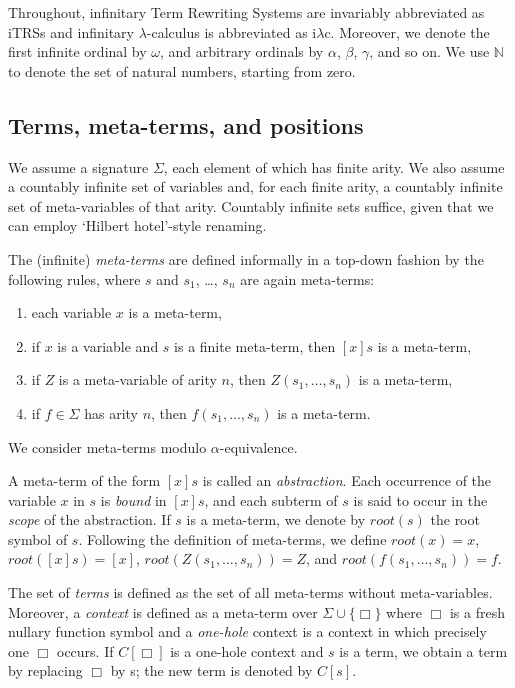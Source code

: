 \documentclass{LMCS}
\theoremstyle{definition}
\newcommand{\rs}[1]{root(#1)}
\newcommand{\natnum}{\mathbb{N}}
\newcommand{\iLC}{i$\lambda$c\xspace}
\begin{document}
Throughout, infinitary Term Rewriting Systems are invariably abbreviated as iTRSs and infinitary $\lambda$-calculus is abbreviated as \iLC. Moreover, we denote the first infinite ordinal by $\omega$, and arbitrary ordinals by $\alpha$, $\beta$, $\gamma$, and so on. We use $\natnum$ to denote the set of natural numbers, starting from zero.

\subsection{Terms, meta-terms, and positions}

We assume a signature $\Sigma$, each element of which has finite arity. We also assume a countably infinite set of variables and, for each finite arity, a countably infinite set of meta-variables of that arity. Countably infinite sets suffice, given that we can employ `Hilbert hotel'-style renaming. 

The (infinite) \emph{meta-terms} are defined informally in a top-down fashion by the following rules, where $s$ and $s_1$, \ldots, $s_n$ are again meta-terms:
\begin{enumerate}[(1)]
\item
each variable $x$ is a meta-term,
\item
if $x$ is a variable and $s$ is a finite meta-term, then $[x] s$ is a meta-term,
\item
if $Z$ is a meta-variable of arity $n$, then $Z(s_1, \ldots, s_n)$ is a meta-term,
\item
if $f \in \Sigma$ has arity $n$, then $f(s_1, \ldots, s_n)$ is a meta-term.
\end{enumerate}

\noindent We consider meta-terms modulo $\alpha$-equivalence.

A meta-term of the form $[x] s$ is called an
\emph{abstraction}. Each occurrence of the variable $x$ in $s$ is
\emph{bound} in $[x]s$, and each subterm of $s$ is said to occur in the
\emph{scope} of the abstraction. If $s$ is a meta-term, we denote by $\rs{s}$ the root symbol of $s$. Following the definition of meta-terms, we define $\rs{x} = x$, $\rs{[x]s} = [x]$, $\rs{Z(s_1, \ldots, s_n)} = Z$, and $\rs{f(s_1, \ldots, s_n)} = f$.

The set of \emph{terms} is defined as the set of all meta-terms without meta-variables. Moreover, a \emph{context} is defined as a meta-term over $\Sigma \cup \{ \Box \}$ where $\Box$ is a fresh nullary function symbol and a \emph{one-hole} context is a context in which precisely one $\Box$ occurs. If $C[\Box]$ is a one-hole context and $s$ is a term, we obtain a term by replacing $\Box$ by s; the new term is denoted by $C[s]$.
\end{document}

